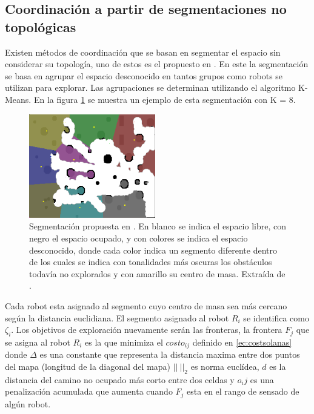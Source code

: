 \subsection{Coordinación a partir de segmentaciones no topológicas}\label{subsec:coordNoTop}
Existen métodos de coordinación que se basan en segmentar el espacio sin considerar su topología, uno de estos es el propuesto en \cite{Solanas2004}. En este la segmentación se basa en agrupar el espacio desconocido en tantos grupos como robots se utilizan para explorar. Las agrupaciones se determinan utilizando el algoritmo K-Means\cite{hartigan1979ak}. En la figura \ref{fig:ejemploCoodGrill} se muestra un ejemplo de esta segmentación con K = 8.  %
\begin{figure}[H]
  \center
  \includegraphics[width=5.5cm]{imagenes/coordGrillCM.png}
  \caption[Segmentación propuesta en \cite{Solanas2004}.]{Segmentación propuesta en \cite{Solanas2004}. En blanco se indica el espacio libre, con negro el espacio ocupado, y con colores se indica el espacio desconocido, donde cada color indica un segmento diferente dentro de los cuales se indica con tonalidades más oscuras los obstáculos todavía no explorados y con amarillo su centro de masa. Extraída de \cite{wu2007voronoi}.}\label{fig:ejemploCoodGrill}
\end{figure} 

Cada robot esta asignado al segmento cuyo centro de masa sea más cercano según la distancia euclidiana. El segmento asignado al robot $R_i$ se identifica como $\zeta_i$.
Los objetivos de exploración nuevamente serán las fronteras, la frontera $F_j$ que se asigna al robot $R_i$ es la que minimiza el $costo_{ij}$ definido en \eqref{ec:costsolanas} donde $\Delta$ es una constante que representa la distancia maxima entre dos puntos del mapa (longitud de la diagonal del mapa) $||\ ||_2$ es norma euclídea, $d$ es la distancia del camino no ocupado más corto entre dos celdas y $o_ij$ es una penalización acumulada que aumenta cuando $F_j$ esta en el rango de sensado de algún robot.

